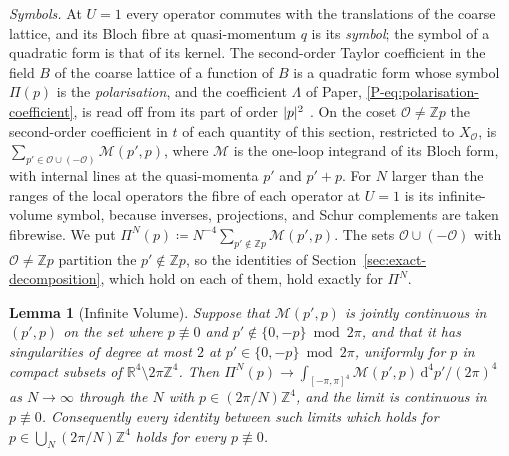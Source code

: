 \documentclass[11pt]{preprint}
\newcommand{\dd}{\mathrm{d}}
\DeclarePairedDelimiter{\abs}{\lvert}{\rvert}
\numberwithin{equation}{section}
\newtheorem{lemma}{Lemma}[section]
\theoremstyle{definition}
\theoremstyle{remark}
\theoremstyle{plain}
\begin{document}
\emph{Symbols.} At $U = 1$ every operator commutes with the translations of the coarse lattice, and its Bloch fibre at quasi-momentum $q$ is its \emph{symbol}; the symbol of a quadratic form is that of its kernel. The second-order Taylor coefficient in the field $B$ of the coarse lattice of a function of $B$ is a quadratic form whose symbol $\Pi(p)$ is the \emph{polarisation}, and the coefficient $\Lambda$ of Paper, \eqref{P-eq:polarisation-coefficient}, is read off from its part of order $\abs{p}^2$ \cite[(1.22), p.~264]{BalabanRG1}. On the coset $\mathcal O \neq \mathbb Zp$ the second-order coefficient in $t$ of each quantity of this section, restricted to $X_{\mathcal O}$, is $\sum_{p' \in \mathcal O \cup (-\mathcal O)}\mathcal M(p', p)$, where $\mathcal M$ is the one-loop integrand of its Bloch form, with internal lines at the quasi-momenta $p'$ and $p' + p$. For $N$ larger than the ranges of the local operators the fibre of each operator at $U = 1$ is its infinite-volume symbol, because inverses, projections, and Schur complements are taken fibrewise. We put $\Pi^N(p) \coloneqq N^{-4}\sum_{p' \notin \mathbb Zp}\mathcal M(p', p)$. The sets $\mathcal O \cup (-\mathcal O)$ with $\mathcal O \neq \mathbb Zp$ partition the $p' \notin \mathbb Zp$, so the identities of Section~\ref{sec:exact-decomposition}, which hold on each of them, hold exactly for $\Pi^N$.

\begin{lemma}[Infinite Volume]\label{lem:infinite-volume}
Suppose that $\mathcal M(p', p)$ is jointly continuous in $(p', p)$ on the set where $p \not\equiv 0$ and $p' \notin \{ 0, -p \} \bmod 2\pi$, and that it has singularities of degree at most $2$ at $p' \in \{ 0, -p \} \bmod 2\pi$, uniformly for $p$ in compact subsets of $\mathbb R^4 \setminus 2\pi\mathbb Z^4$. Then $\Pi^N(p) \to \int_{[-\pi,\pi]^4}\mathcal M(p', p)\,\dd^4p'/(2\pi)^4$ as $N \to \infty$ through the $N$ with $p \in (2\pi/N)\mathbb Z^4$, and the limit is continuous in $p \not\equiv 0$. Consequently every identity between such limits which holds for $p \in \bigcup_N(2\pi/N)\mathbb Z^4$ holds for every $p \not\equiv 0$.
\end{lemma}
\end{document}
